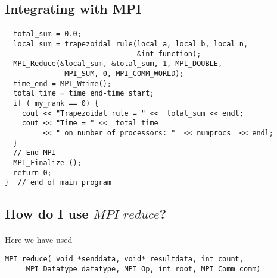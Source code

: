 \documentclass[%
oneside,                 %
final,                   %
10pt]{article}
\begin{document}
\subsection*{Integrating with \textbf{MPI}}

\paragraph{}


















\begin{verbatim}
  total_sum = 0.0;
  local_sum = trapezoidal_rule(local_a, local_b, local_n, 
                               &int_function); 
  MPI_Reduce(&local_sum, &total_sum, 1, MPI_DOUBLE, 
              MPI_SUM, 0, MPI_COMM_WORLD);
  time_end = MPI_Wtime();
  total_time = time_end-time_start;
  if ( my_rank == 0) {
    cout << "Trapezoidal rule = " <<  total_sum << endl;
    cout << "Time = " <<  total_time  
         << " on number of processors: "  << numprocs  << endl;
  }
  // End MPI
  MPI_Finalize ();  
  return 0;
}  // end of main program

\end{verbatim}



\subsection*{How do I use $MPI\_reduce$?}

\paragraph{}

Here we have used



\begin{verbatim}
MPI_reduce( void *senddata, void* resultdata, int count, 
     MPI_Datatype datatype, MPI_Op, int root, MPI_Comm comm)

\end{verbatim}
\end{document}
